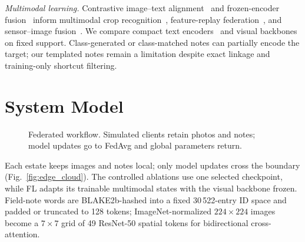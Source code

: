 \documentclass[conference]{IEEEtran}
\begin{document}
\emph{Multimodal learning.} Contrastive image--text alignment~\cite{Radford2021}
and frozen-encoder fusion~\cite{Li2023} inform multimodal crop
recognition~\cite{Wang2025LLMICDP}, feature-replay federation~\cite{Li2025FedReplay},
and sensor--image fusion~\cite{Garg2025Multimodal}. We compare compact
text encoders~\cite{Sanh2019} and visual
backbones~\cite{He2016ResNet,Dosovitskiy2021,Touvron2021,Liu2021Swin,Liu2022ConvNeXT,Tan2019}
on fixed support. Class-generated or class-matched notes can partially encode
the target; our templated notes remain a limitation despite exact linkage and
training-only shortcut filtering.


\section{System Model}
\label{sec:sysmodel}

\begin{figure}[t]
\centering
\resizebox{\linewidth}{!}{}
\caption{Federated workflow. Simulated clients retain photos and notes; model updates go to FedAvg and global parameters return.}
\label{fig:arch}
\end{figure}

Each estate keeps images and notes local; only model updates cross the
boundary (Fig.~\ref{fig:edge_cloud}).
The controlled ablations use one selected checkpoint, while FL adapts its
trainable multimodal states with the visual backbone frozen. Field-note words
are BLAKE2b-hashed into a fixed 30\,522-entry ID space and padded or truncated
to 128 tokens; ImageNet-normalized $224{\times}224$ images become a
$7{\times}7$ grid of 49 ResNet-50 spatial tokens for bidirectional
cross-attention.

\end{document}
